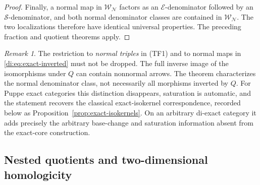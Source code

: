 \documentclass[11pt,reqno,a4paper]{amsart}
\theoremstyle{definition}
\theoremstyle{remark}
\newtheorem{remark}[theorem]{Remark}
\newcommand{\N}{\mathcal{N}}
\newcommand{\0}{\mathbf{0}}
\renewcommand{\1}{\mathbf{1}}
\newcommand{\Sden}{\mathcal S}
\newcommand{\Eden}{\mathcal E}
\begin{document}
\begin{proof}
Finally, a normal map in $\mathcal W_{\N}$ factors as an
$\Eden$-denominator followed by an $\Sden$-denominator, and both
normal denominator classes are contained in $\mathcal W_{\N}$.
The two localizations therefore have identical universal properties.
The preceding fraction and quotient theorems apply.
\end{proof}

\begin{remark}
The restriction to \emph{normal triples} in (TF1) and to normal maps
in \eqref{di:eq:exact-inverted} must not be dropped. The full inverse
image of the isomorphisms under $Q$ can contain nonnormal arrows.
The theorem characterizes the normal denominator class, not necessarily
all morphisms inverted by $Q$. For Puppe exact categories this
distinction disappears, saturation is automatic, and the statement
recovers the classical exact-isokernel correspondence, recorded below
as Proposition~\ref{prop:exact-isokernels}. On an arbitrary
di-exact category it adds precisely the arbitrary base-change and
saturation information absent from the exact-core construction.
\end{remark}

\subsection{Nested quotients and two-dimensional homologicity}\label{di:sec:2dim}
\end{document}
